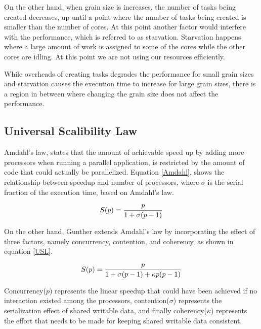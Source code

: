 On the other hand, when grain size is increases, the number of tasks being created decreases, up until a point where the number of tasks being created is smaller than the number of cores. At this point another factor would interfere with the performance, which is referred to as starvation. Starvation happens where a large amount of work is assigned to some of the cores while the other cores are idling. At this point we are not using our resources efficiently. 

While overheads of creating tasks degrades the performance for small grain sizes and starvation causes the execution time to increase for large grain sizes, there is a region in between where changing the grain size does not affect the performance. 
	



\subsection{Universal Scalibility Law}
Amdahl's law\cite{amdahl1967validity}, states that the amount of achievable speed up by adding more processors when running a parallel application, is restricted by the amount of code that could actually be parallelized. 
Equation \ref{Amdahl}, shows the relationship between speedup and number of processors, where $\sigma$ is the serial fraction of the execution time, based on Amdahl's law\cite{gunther2007guerrilla}. 

\begin{equation}\label{Amdahl}
S(p) = \frac{p}{1+\sigma(p-1)}\\
\end{equation}

On the other hand, Gunther\cite{gunther2007guerrilla} extends Amdahl's law by incorporating the effect of three factors, namely concurrency, contention, and coherency, as shown in equation \ref{USL}.

\begin{equation}\label{USL}
S(p) = \frac{p}{1+\sigma(p-1)+\kappa{p}(p-1)}\\
\end{equation}

Concurrency($p$) represents the linear speedup that could have been achieved if no interaction existed among the processors, contention($\sigma$) represents the serialization effect of shared writable data, and finally coherency($\kappa$) represents the effort that needs to be made for keeping shared writable data consistent\cite{gunther2007guerrilla}.    

